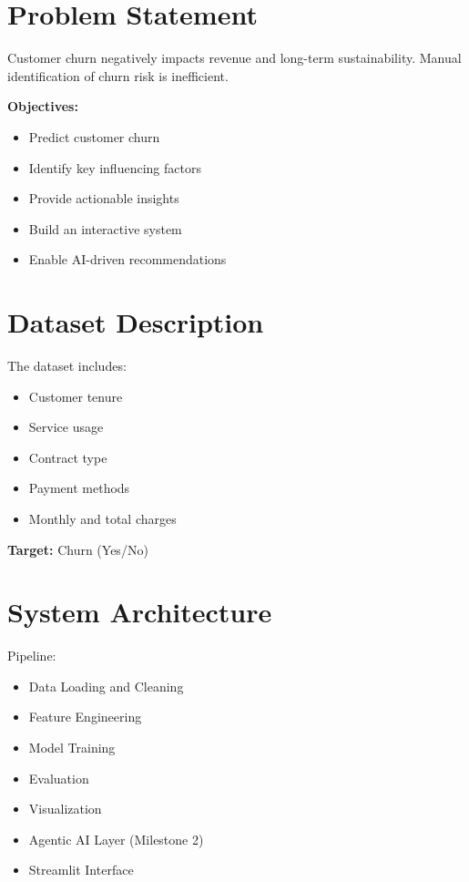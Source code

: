 \documentclass[12pt]{article}
\begin{document}
\section{Problem Statement}

Customer churn negatively impacts revenue and long-term sustainability. Manual identification of churn risk is inefficient.

\textbf{Objectives:}
\begin{itemize}
\item Predict customer churn
\item Identify key influencing factors
\item Provide actionable insights
\item Build an interactive system
\item Enable AI-driven recommendations
\end{itemize}

\section{Dataset Description}

The dataset includes:
\begin{itemize}
\item Customer tenure
\item Service usage
\item Contract type
\item Payment methods
\item Monthly and total charges
\end{itemize}

\textbf{Target:} Churn (Yes/No)

\section{System Architecture}

Pipeline:
\begin{itemize}
\item Data Loading and Cleaning
\item Feature Engineering
\item Model Training
\item Evaluation
\item Visualization
\item Agentic AI Layer (Milestone 2)
\item Streamlit Interface
\end{itemize}
\end{document}

